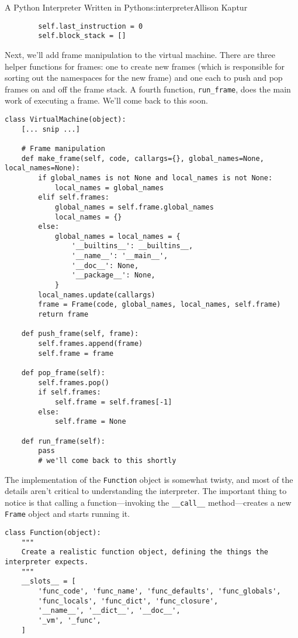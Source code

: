 \begin{aosachapter}{A Python Interpreter Written in Python}{s:interpreter}{Allison Kaptur}
\begin{verbatim}
        self.last_instruction = 0
        self.block_stack = []
\end{verbatim}

Next, we'll add frame manipulation to the virtual machine. There are
three helper functions for frames: one to create new frames (which is
responsible for sorting out the namespaces for the new frame) and one
each to push and pop frames on and off the frame stack. A fourth
function, \texttt{run\_frame}, does the main work of executing a frame.
We'll come back to this soon.

\begin{verbatim}
class VirtualMachine(object):
    [... snip ...]

    # Frame manipulation
    def make_frame(self, code, callargs={}, global_names=None, local_names=None):
        if global_names is not None and local_names is not None:
            local_names = global_names
        elif self.frames:
            global_names = self.frame.global_names
            local_names = {}
        else:
            global_names = local_names = {
                '__builtins__': __builtins__,
                '__name__': '__main__',
                '__doc__': None,
                '__package__': None,
            }
        local_names.update(callargs)
        frame = Frame(code, global_names, local_names, self.frame)
        return frame

    def push_frame(self, frame):
        self.frames.append(frame)
        self.frame = frame

    def pop_frame(self):
        self.frames.pop()
        if self.frames:
            self.frame = self.frames[-1]
        else:
            self.frame = None

    def run_frame(self):
        pass
        # we'll come back to this shortly
\end{verbatim}

\label{the-function-class}

The implementation of the \texttt{Function} object is somewhat twisty,
and most of the details aren't critical to understanding the
interpreter. The important thing to notice is that calling a
function---invoking the \texttt{\_\_call\_\_} method---creates a new
\texttt{Frame} object and starts running it.

\begin{verbatim}
class Function(object):
    """
    Create a realistic function object, defining the things the interpreter expects.
    """
    __slots__ = [
        'func_code', 'func_name', 'func_defaults', 'func_globals',
        'func_locals', 'func_dict', 'func_closure',
        '__name__', '__dict__', '__doc__',
        '_vm', '_func',
    ]


\end{verbatim}
\end{aosachapter}
